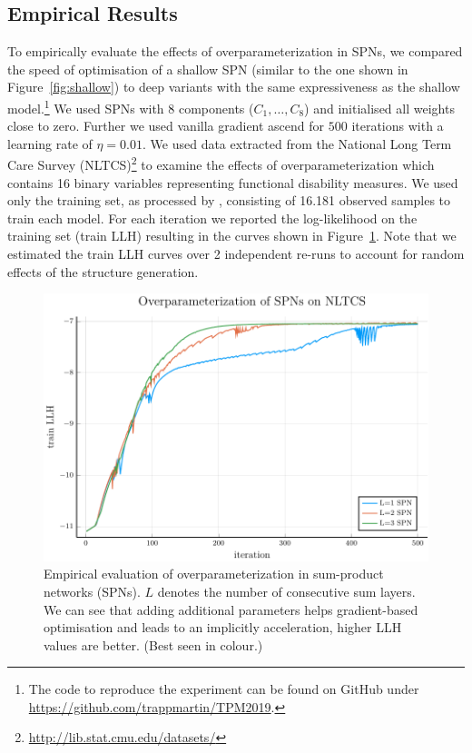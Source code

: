 \documentclass{article}
\begin{document}
\subsection{Empirical Results}
To empirically evaluate the effects of overparameterization in SPNs, we compared the speed of optimisation of a shallow SPN (similar to the one shown in Figure~\ref{fig:shallow}) to deep variants with the same expressiveness as the shallow model.\footnote{The code to reproduce the experiment can be found on GitHub under \url{https://github.com/trappmartin/TPM2019}.}
We used SPNs with 8 components ($C_1, \dots, C_8$) and initialised all weights close to zero.
Further we used vanilla gradient ascend for $500$ iterations with a learning rate of $\eta = 0.01$.
We used data extracted from the National Long Term Care Survey (NLTCS)\footnote{\url{http://lib.stat.cmu.edu/datasets/}} to examine the effects of overparameterization which contains 16 binary variables representing functional disability measures. 
We used only the training set, as processed by \cite{Lowd2010}, consisting of 16.181 observed samples to train each model.
For each iteration we reported the log-likelihood on the training set (train LLH) resulting in the curves shown in Figure~\ref{fig:experiment}.
Note that we estimated the train LLH curves over 2 independent re-runs to account for random effects of the structure generation.

\begin{figure}[t]
  \includegraphics[width=\linewidth]{nltcs_experiment}
  \caption{Empirical evaluation of overparameterization in sum-product networks (SPNs). $L$ denotes the number of consecutive sum layers. We can see that adding additional parameters helps gradient-based optimisation and leads to an implicitly acceleration, higher LLH values are better. (Best seen in colour.)}
  \label{fig:experiment}
\end{figure}
\end{document}
